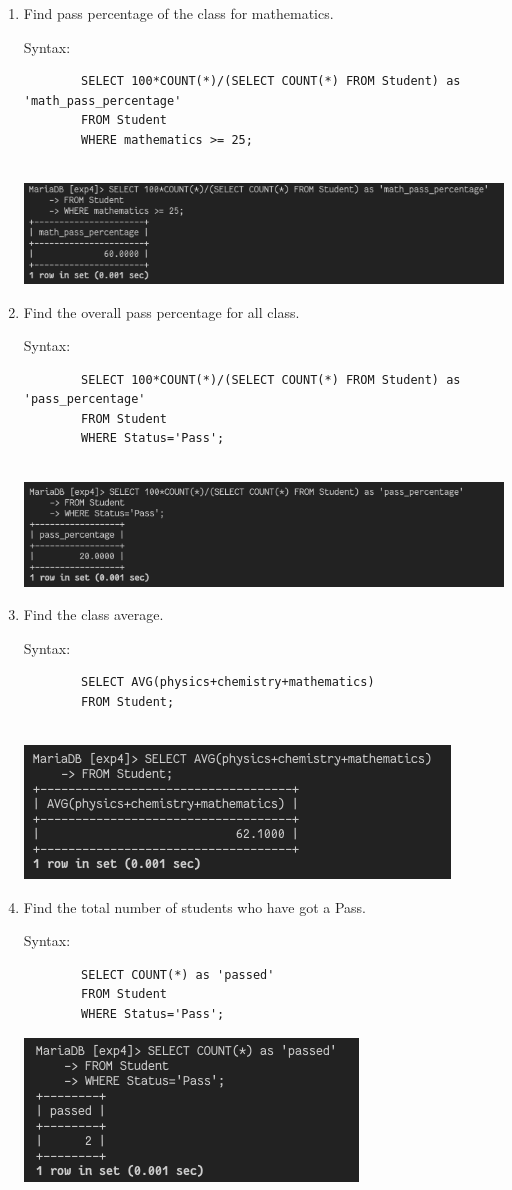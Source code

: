 \documentclass[13pt,oneside]{book}
\begin{document}
\begin{enumerate}
		
		\item
		Find pass percentage of the class for mathematics. 
		 
		Syntax:
		\begin{verbatim}
		SELECT 100*COUNT(*)/(SELECT COUNT(*) FROM Student) as 'math_pass_percentage'
		FROM Student
		WHERE mathematics >= 25;
		
		\end{verbatim}
		\includegraphics[width=\textwidth]{img/p4/ss8.png}
		
		
		\item
		Find the overall pass percentage for all class. 
		 
		Syntax:
		\begin{verbatim}
		SELECT 100*COUNT(*)/(SELECT COUNT(*) FROM Student) as 'pass_percentage'
		FROM Student
		WHERE Status='Pass';
		
		\end{verbatim}
		\includegraphics[width=\textwidth]{img/p4/ss9.png}
		
		
		\item
		Find the class average. 
		 
		Syntax:
		\begin{verbatim}
		SELECT AVG(physics+chemistry+mathematics)
		FROM Student;
		
		\end{verbatim}
		\includegraphics[]{img/p4/ss10.png}
		
		
		\item
		Find the total number of students who have got a Pass.
		
		Syntax:
		\begin{verbatim}
		SELECT COUNT(*) as 'passed'
		FROM Student
		WHERE Status='Pass';
		\end{verbatim}
		\includegraphics[]{img/p4/ss11.png}
	\end{enumerate}		
\end{document}
